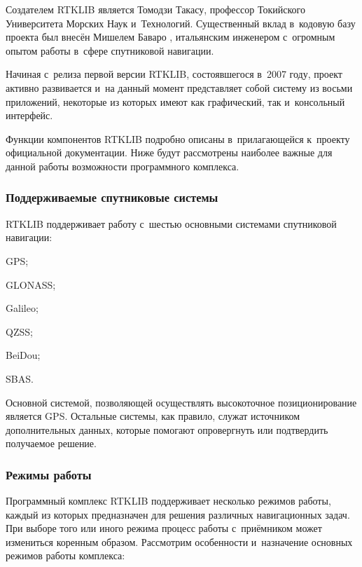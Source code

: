 Создателем RTKLIB является Томодзи Такасу, профессор Токийского Университета Морских Наук и~Технологий. Существенный вклад в~кодовую базу проекта был внесён Мишелем Баваро \cite{RTKLIB,Bavaro}, итальянским инженером с~огромным опытом работы в~сфере спутниковой навигации. \par

Начиная с~релиза первой версии RTKLIB, состоявшегося в~2007 году, проект активно развивается и~на данный момент представляет собой систему из восьми приложений, некоторые из которых имеют как графический, так и~консольный интерфейс. \par

Функции компонентов RTKLIB подробно описаны в~прилагающейся к~проекту официальной документации. Ниже будут рассмотрены наиболее важные для данной работы возможности программного комплекса.

\subsubsection{Поддерживаемые спутниковые системы}
\label{subsec:rtklib-supported-gnss}

RTKLIB поддерживает работу с~шестью основными системами спутниковой навигации:

\begin{dashitemize}
  \item GPS;
  \item GLONASS;
  \item Galileo;
  \item QZSS;
  \item BeiDou;
  \item SBAS.
\end{dashitemize}

Основной системой, позволяющей осуществлять высокоточное позиционирование является GPS. Остальные системы, как правило, служат источником дополнительных данных, которые помогают опровергнуть или подтвердить получаемое решение.

\subsubsection{Режимы работы}
\label{subsec:rtklib-modes}

Программный комплекс RTKLIB поддерживает несколько режимов работы, каждый из которых предназначен для решения различных навигационных задач. При выборе того или иного режима процесс работы с~приёмником может измениться коренным образом. Рассмотрим особенности и~назначение основных режимов работы комплекса:

